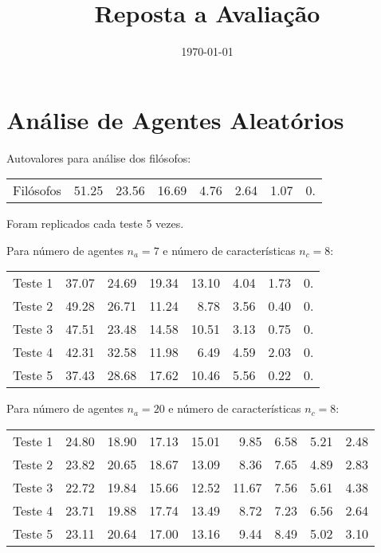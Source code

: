 \documentclass[11pt]{article}
\title{Reposta a Avaliação}
\author{}
\date{\today}
\begin{document}
\maketitle


\section{Análise de Agentes Aleatórios}
\label{sec-1}


  Autovalores para análise dos filósofos:


\begin{center}
\begin{tabular}{lrrrrrrr}
 Filósofos  &  51.25  &  23.56  &  16.69  &  4.76  &  2.64  &  1.07  &  0.  \\
\end{tabular}
\end{center}



  Foram replicados cada teste 5 vezes.

  Para número de agentes $n_a = 7$ e número de características $n_c = 8$:


\begin{center}
\begin{tabular}{lrrrrrrr}
 Teste 1  &  37.07  &  24.69  &  19.34  &  13.10  &  4.04  &  1.73  &  0.  \\
 Teste 2  &  49.28  &  26.71  &  11.24  &   8.78  &  3.56  &  0.40  &  0.  \\
 Teste 3  &  47.51  &  23.48  &  14.58  &  10.51  &  3.13  &  0.75  &  0.  \\
 Teste 4  &  42.31  &  32.58  &  11.98  &   6.49  &  4.59  &  2.03  &  0.  \\
 Teste 5  &  37.43  &  28.68  &  17.62  &  10.46  &  5.56  &  0.22  &  0.  \\
\end{tabular}
\end{center}



  Para número de agentes $n_a = 20$ e número de características $n_c = 8$:


\begin{center}
\begin{tabular}{lrrrrrrrr}
 Teste 1  &  24.80  &  18.90  &  17.13  &  15.01  &   9.85  &  6.58  &  5.21  &  2.48  \\
 Teste 2  &  23.82  &  20.65  &  18.67  &  13.09  &   8.36  &  7.65  &  4.89  &  2.83  \\
 Teste 3  &  22.72  &  19.84  &  15.66  &  12.52  &  11.67  &  7.56  &  5.61  &  4.38  \\
 Teste 4  &  23.71  &  19.88  &  17.74  &  13.49  &   8.72  &  7.23  &  6.56  &  2.64  \\
 Teste 5  &  23.11  &  20.64  &  17.00  &  13.16  &   9.44  &  8.49  &  5.02  &  3.10  \\
\end{tabular}
\end{center}
\end{document}
